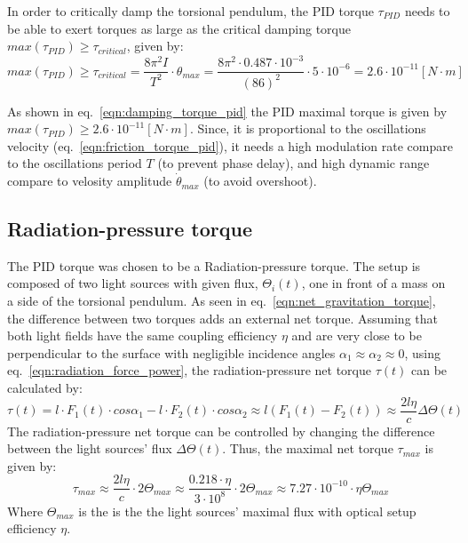 \documentclass[\main/master.tex]{subfiles}
\begin{document}
In order to critically damp the torsional pendulum, the PID torque $\tau_{PID}$ needs to be able to exert torques as large as the critical damping torque $max(\tau_{PID}) \geq  \tau_{critical}$, given by:
\begin{equation}
max(\tau_{PID}) \geq  \tau_{critical} = \frac{ 8 \pi^2 I }{T^2}\cdot\theta_{max} = \frac{ 8 \pi^2 \cdot 0.487\cdot10^{-3} }{(86)^2}\cdot 5\cdot10^{-6} = 2.6\cdot10^{-11}[N\cdot m]
\label{eqn:damping_torque_pid}
\end{equation}
\par\noindent
As shown in  eq.~\ref{eqn:damping_torque_pid} the PID maximal torque is given by $max(\tau_{PID}) \geq 2.6\cdot10^{-11}[N\cdot m]$. Since, it is proportional to the oscillations velocity (eq.~\ref{eqn:friction_torque_pid}), it needs a high modulation rate compare to the oscillations period $T$ (to prevent phase delay), and high dynamic range compare to velosity amplitude $\dot{\theta}_{max}$ (to avoid overshoot). 
\subsection{Radiation-pressure torque}
The PID torque was chosen to be a Radiation-pressure torque. The setup is composed of two light sources with given flux, $\Theta_i(t)$, one in front of a mass on a side of the torsional pendulum. As seen in eq.~\ref{eqn:net_gravitation_torque}, the difference between two torques adds an external net torque. Assuming that both light fields have the same coupling efficiency $\eta$ and are very close to be perpendicular to the surface with negligible incidence angles $\alpha_1\approx\alpha_2\approx 0$, using eq.~\ref{eqn:radiation_force_power}, the radiation-pressure net torque $\tau(t)$ can be calculated by:  
\begin{equation}
\tau(t) = l\cdot F_1(t) \cdot cos\alpha_1 - l\cdot F_2(t) \cdot cos\alpha_2\approx l(F_1(t) - F_2(t)) \approx \frac{2l\eta}{{c}} \Delta \Theta(t) \label{eqn:radiation torque}
\end{equation}
The radiation-pressure net torque can be controlled by changing the difference between the light sources' flux $\Delta \Theta(t)$. Thus, the maximal net torque $\tau_{max}$ is given by: 
\begin{equation}
\tau_{max}  \approx \frac{2l\eta}{{c}} \cdot 2 \Theta_{max} \approx \frac{0.218\cdot \eta}{{3\cdot10^{8}}} \cdot 2 \Theta_{max} \approx 7.27\cdot10^{-10} \cdot \eta\Theta_{max}   \label{eqn:max radiation torque}
\end{equation}
Where $\Theta_{max}$ is the is the the light sources' maximal flux with optical setup efficiency $\eta$. 
\end{document}
